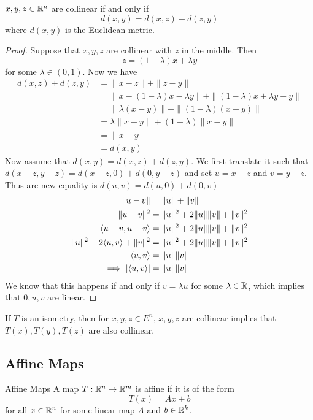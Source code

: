 \documentclass[a4paper]{article}
\begin{document}
\begin{prp}{}{} $x,y,z\in\mathbb{R}^n$ are collinear if and only if $$d(x,y)=d(x,z)+d(z,y)$$ where $d(x,y)$ is the Euclidean metric. \tcbline
\begin{proof} Suppose that $x,y,z$ are collinear with $z$ in the middle. Then $$z=(1-\lambda)x+\lambda y$$ for some $\lambda\in(0,1)$. Now we have 
\begin{align*}
d(x,z)+d(z,y)&=\|x-z\|+\|z-y\|\\
&=\|x-(1-\lambda)x-\lambda y\|+\|(1-\lambda)x+\lambda y-y\|\\
&=\|\lambda(x-y)\|+\|(1-\lambda)(x-y)\|\\
&=\lambda\|x-y\|+(1-\lambda)\|x-y\|\\
&=\|x-y\|\\
&=d(x,y)
\end{align*}
Now assume that $d(x,y)=d(x,z)+d(z,y)$. We first translate it such that $d(x-z,y-z)=d(x-z,0)+d(0,y-z)$ and set $u=x-z$ and $v=y-z$. Thus are new equality is $d(u,v)=d(u,0)+d(0,v)$
\begin{align*}
\|u-v\|&=\|u\|+\|v\|\\
\|u-v\|^2&=\|u\|^2+2\|u\|\|v\|+\|v\|^2\\
\langle u-v,u-v\rangle&=\|u\|^2+2\|u\|\|v\|+\|v\|^2\\
\|u\|^2-2\langle u,v\rangle+\|v\|^2&=\|u\|^2+2\|u\|\|v\|+\|v\|^2\\
-\langle u,v\rangle&=\|u\|\|v\|\\
\implies\abs{\langle u,v\rangle}&=\|u\|\|v\|\\
\end{align*}
We know that this happens if and only if $v=\lambda u$ for some $\lambda\in\mathbb{R}$, which implies that $0,u,v$ are linear. 
\end{proof}
\end{prp}

\begin{prp}{}{} If $T$ is an isometry, then for $x,y,z\in E^n$, $x,y,z$ are collinear implies that $T(x),T(y),T(z)$ are also collinear. 
\end{prp}

\subsection{Affine Maps}
\begin{defn}{Affine Maps}{} A map $T:\mathbb{R}^n\to\mathbb{R}^m$ is affine if it is of the form $$T(x)=Ax+b$$ for all $x\in\mathbb{R}^n$ for some linear map $A$ and $b\in\mathbb{R}^k$. 
\end{defn}
\end{document}
